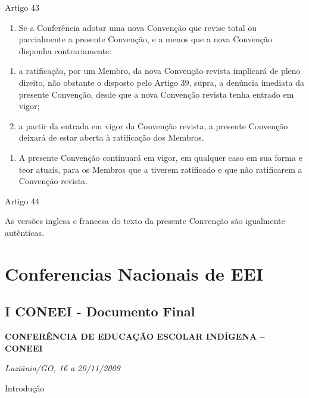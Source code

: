 \documentclass[
]{book}
\providecommand{\tightlist}{%
  \setlength{\itemsep}{0pt}\setlength{\parskip}{0pt}}
\begin{document}
Artigo 43

\begin{enumerate}
\def\labelenumi{\arabic{enumi}.}
\tightlist
\item
  Se a Conferência adotar uma nova Convenção que revise total ou parcialmente a presente Convenção, e a menos que a nova Convenção disponha contrariamente:
\end{enumerate}

\begin{enumerate}
\def\labelenumi{\alph{enumi})}
\item
  a ratificação, por um Membro, da nova Convenção revista implicará de pleno direito, não obstante o disposto pelo Artigo 39, supra, a denúncia imediata da presente Convenção, desde que a nova Convenção revista tenha entrado em vigor;
\item
  a partir da entrada em vigor da Convenção revista, a presente Convenção deixará de estar aberta à ratificação dos Membros.
\end{enumerate}

\begin{enumerate}
\def\labelenumi{\arabic{enumi}.}
\setcounter{enumi}{1}
\tightlist
\item
  A presente Convenção continuará em vigor, em qualquer caso em sua forma e teor atuais, para os Membros que a tiverem ratificado e que não ratificarem a Convenção revista.
\end{enumerate}

Artigo 44

As versões inglesa e francesa do texto da presente Convenção são igualmente autênticas.

\hypertarget{conferencias-nacionais-de-eei}{%
\chapter{Conferencias Nacionais de EEI}\label{conferencias-nacionais-de-eei}}

\hypertarget{i-coneei---documento-final}{%
\section{I CONEEI - Documento Final}\label{i-coneei---documento-final}}

\textbf{CONFERÊNCIA DE EDUCAÇÃO ESCOLAR INDÍGENA -- CONEEI}

\emph{Luziânia/GO, 16 a 20/11/2009}

Introdução
\end{document}
